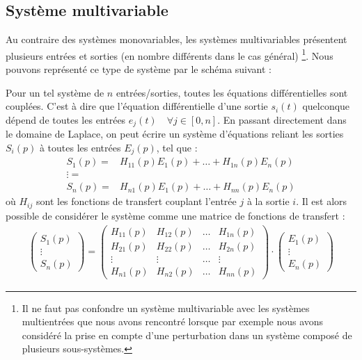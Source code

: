 \subsection{Système multivariable}
Au contraire des systèmes monovariables, les systèmes multivariables présentent
plusieurs entrées et sorties (en nombre différents dans le cas général)
\footnote{Il ne faut pas confondre un système
multivariable avec les systèmes multientrées que nous avons rencontré lorsque
par exemple nous avons considéré la prise en compte d'une perturbation dans
un système composé de plusieurs sous-systèmes.}. Nous pouvons représenté ce 
type de système par le schéma suivant :
\begin{center}
    
\end{center}
Pour un tel système de $n$ entrées/sorties, 
toutes les équations différentielles sont couplées. 
C'est à dire que l'équation différentielle d'une sortie $s_i(t)$ quelconque 
dépend de toutes les entrées $e_j(t)\quad\forall j\in[0,n]$. En passant 
directement dans le domaine de 
Laplace, on peut écrire un système d'équations reliant les sorties $S_i(p)$ 
à toutes les entrées $E_j(p)$, tel que  :
\begin{align*}
    S_1(p) =& H_{11}(p) E_1(p) + \ldots + H_{1n}(p) E_n(p) \\
    \vdots =& \\ 
    S_n(p) =& H_{n1}(p) E_1(p) + \ldots + H_{nn}(p) E_n(p)
\end{align*}
où $H_{ij}$ sont les fonctions de transfert couplant l'entrée $j$ à la sortie 
$i$. Il est alors possible de considérer le système comme une matrice 
de fonctions de transfert :
\begin{align*}
    \begin{pmatrix} 
        S_1(p)\\
        \vdots\\
        S_n(p)
    \end{pmatrix}=
    \begin{pmatrix} 
        H_{11}(p) & H_{12}(p) &\ldots & H_{1n}(p) \\
        H_{21}(p) & H_{22}(p) &\ldots & H_{2n}(p) \\
        \vdots    & \vdots    &\ldots & \vdots    \\ 
        H_{n1}(p) & H_{n2}(p) &\ldots & H_{nn}(p) 
    \end{pmatrix}\cdot
    \begin{pmatrix} 
        E_1(p)\\
        \vdots\\
        E_n(p)
    \end{pmatrix}
\end{align*}
